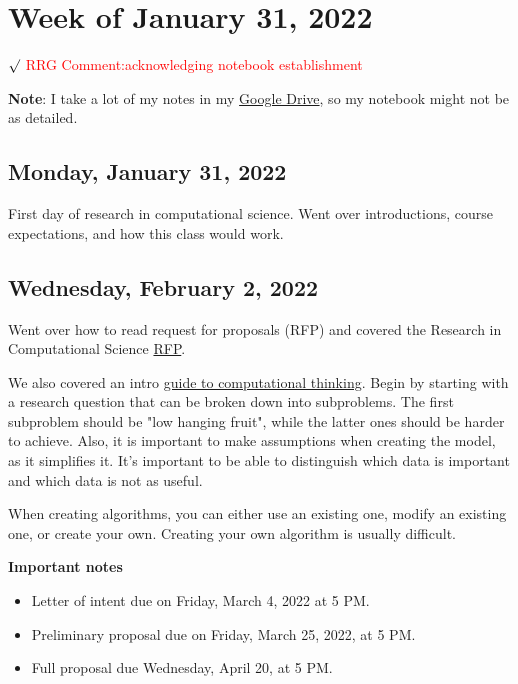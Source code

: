 \documentclass[11pt,letterpaper]{article}
\begin{document}
\univlogo

\section{Week of January 31, 2022}

$\surd$ {\Large \textcolor{red}{RRG Comment:acknowledging notebook establishment } } 

\textbf{Note}: I take a lot of my notes in my \href{https://drive.google.com/drive/folders/17ZhkJZveiDomM2K2MYST_-PhuzrndiVT?usp=sharing}{Google Drive}, so my notebook might not be as detailed.

\subsection{Monday, January 31, 2022}
First day of research in computational science. Went over introductions, course expectations, and how this class would work.

\subsection{Wednesday, February 2, 2022}
Went over how to read request for proposals (RFP) and covered the Research in Computational Science \href{https://drive.google.com/file/d/1cvPQnz40H3bqiEyOdgzRMyYjtK4gxPB5/view?usp=sharing}{RFP}.


We also covered an intro \href{https://drive.google.com/file/d/1hlGEsI95i6WEo5NzAbqjr73ax-MP5L8G/view?usp=sharing}{guide to computational thinking}. Begin by starting with a research question that can be broken down into subproblems. The first subproblem should be "low hanging fruit", while the latter ones should be harder to achieve. Also, it is important to make assumptions when creating the model, as it simplifies it. It's important to be able to distinguish which data is important and which data is not as useful. 

When creating algorithms, you can either use an existing one, modify an existing one, or create your own. Creating your own algorithm is usually difficult. 

\textbf{Important notes}
\begin{itemize}
    \item Letter of intent due on Friday, March 4, 2022 at 5 PM. 
    \item Preliminary proposal due on Friday, March 25, 2022, at 5 PM. 
    \item Full proposal due Wednesday, April 20, at 5 PM. 
\end{itemize}
\end{document}
